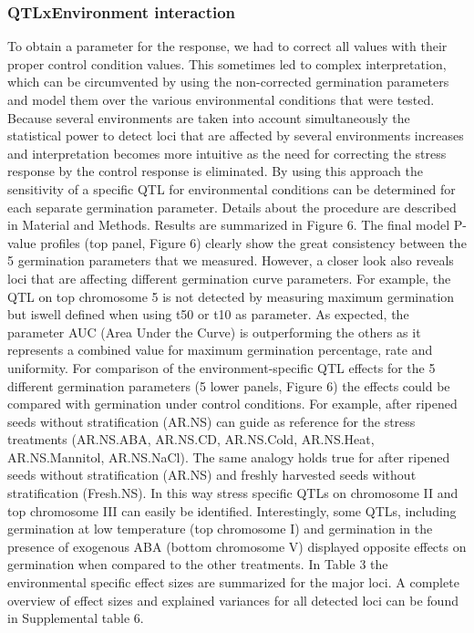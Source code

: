 \subsubsection{QTLxEnvironment interaction}
To obtain a parameter for the response, we had to correct all values with their proper control condition 
values. This sometimes led to complex interpretation, which can be circumvented by using the non-corrected 
germination parameters and model them over the various environmental conditions that were tested. Because 
several environments are taken into account simultaneously the statistical power to detect loci that are 
affected by several environments increases and interpretation becomes more intuitive as the need for 
correcting the stress response by the control response is eliminated. By using this approach the 
sensitivity of a specific QTL for environmental conditions can be determined for each separate germination 
parameter. Details about the procedure are described in Material and Methods. Results are summarized in 
Figure 6. The final model P-value profiles (top panel, Figure 6) clearly show the great consistency 
between the 5 germination parameters that we measured. However, a closer look also reveals loci that 
are affecting different germination curve parameters. For example, the QTL on top chromosome 5 is not 
detected by measuring maximum germination but iswell defined when using t50 or t10 as parameter. As 
expected, the parameter AUC (Area Under the Curve) is outperforming the others as it represents a 
combined value for maximum germination percentage, rate and uniformity. For comparison of the 
environment-specific QTL effects for the 5 different germination parameters (5 lower panels, Figure 6) 
the effects could be compared with germination under control conditions. For example, after ripened 
seeds without stratification (AR.NS) can guide as reference for the stress treatments (AR.NS.ABA, AR.NS.CD, 
AR.NS.Cold, AR.NS.Heat, AR.NS.Mannitol, AR.NS.NaCl). The same analogy holds true for after ripened seeds
without stratification (AR.NS) and freshly harvested seeds without stratification (Fresh.NS). In this way 
stress specific QTLs on chromosome II and top chromosome III can easily be identified. Interestingly, some 
QTLs, including germination at low temperature (top chromosome I) and germination in the presence of 
exogenous ABA (bottom chromosome V) displayed opposite effects on germination when compared to the 
other treatments. In Table 3 the environmental specific effect sizes are summarized for the major loci. 
A complete overview of effect sizes and explained variances for all detected loci can be found in 
Supplemental table 6.

